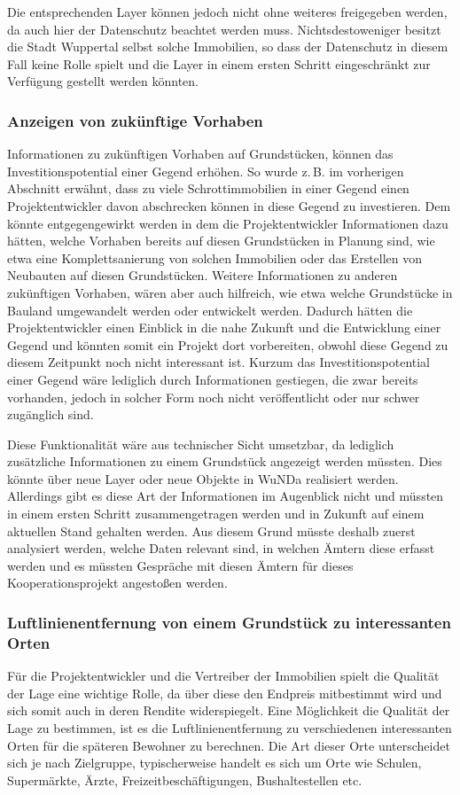 Die entsprechenden Layer können jedoch nicht ohne weiteres freigegeben werden, da auch hier  der Datenschutz beachtet werden muss.
Nichtsdestoweniger besitzt die Stadt Wuppertal selbst solche Immobilien, so dass der Datenschutz in diesem Fall keine Rolle spielt und die Layer in einem ersten Schritt eingeschränkt zur Verfügung gestellt werden könnten.
  
\subsubsection{Anzeigen von zukünftige Vorhaben}
Informationen zu zukünftigen Vorhaben auf Grundstücken, können das Investitionspotential einer Gegend erhöhen.
So wurde z.\,B. im vorherigen Abschnitt erwähnt, dass zu viele Schrottimmobilien in einer Gegend einen Projektentwickler davon abschrecken können in diese Gegend zu investieren.
Dem könnte entgegengewirkt werden in dem die Projektentwickler Informationen dazu hätten, welche Vorhaben bereits auf diesen Grundstücken in Planung sind, wie etwa eine Komplettsanierung von solchen Immobilien oder das Erstellen von Neubauten auf diesen Grundstücken.
Weitere Informationen zu anderen zukünftigen Vorhaben, wären aber auch hilfreich, wie etwa welche Grundstücke in Bauland umgewandelt werden oder entwickelt werden. 
Dadurch hätten die Projektentwickler einen Einblick in die nahe Zukunft und die Entwicklung einer Gegend und könnten somit ein Projekt dort vorbereiten, obwohl diese Gegend zu diesem Zeitpunkt noch nicht interessant ist.
Kurzum das Investitionspotential einer Gegend wäre lediglich durch Informationen gestiegen, die zwar bereits vorhanden, jedoch in solcher Form noch nicht veröffentlicht oder nur schwer zugänglich sind.

Diese Funktionalität wäre aus technischer Sicht umsetzbar, da lediglich zusätzliche Informationen zu einem Grundstück angezeigt werden müssten.
Dies könnte über neue Layer oder neue Objekte in \ac{WuNDa} realisiert werden.
Allerdings gibt es diese Art der Informationen im Augenblick nicht und müssten in einem ersten Schritt zusammengetragen werden und in Zukunft auf einem aktuellen Stand gehalten werden.
Aus diesem Grund müsste deshalb zuerst analysiert werden, welche Daten relevant sind, in welchen Ämtern diese erfasst werden und es müssten Gespräche mit diesen Ämtern für dieses Kooperationsprojekt angestoßen werden.
 
\subsubsection{Luftlinienentfernung von einem Grundstück zu interessanten Orten}
Für die Projektentwickler und die Vertreiber der Immobilien spielt die Qualität der Lage eine wichtige Rolle, da über diese den Endpreis mitbestimmt wird und sich somit auch in deren Rendite widerspiegelt.
Eine Möglichkeit die Qualität der Lage zu bestimmen, ist es die Luftlinienentfernung zu verschiedenen interessanten Orten für die späteren Bewohner zu berechnen.
Die Art dieser Orte unterscheidet sich je nach Zielgruppe, typischerweise handelt es sich um Orte wie Schulen, Supermärkte, Ärzte, Freizeitbeschäftigungen, Bushaltestellen etc.

